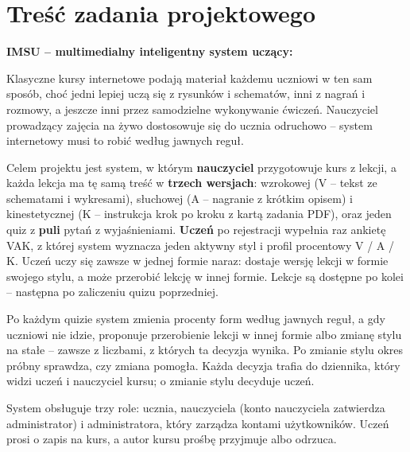 \section{Treść zadania projektowego}

\textbf{IMSU -- multimedialny inteligentny system uczący:}

Klasyczne kursy internetowe podają materiał każdemu uczniowi w ten sam sposób, choć jedni lepiej uczą się z rysunków i schematów, inni z nagrań i rozmowy, a jeszcze inni przez samodzielne wykonywanie ćwiczeń. Nauczyciel prowadzący zajęcia na żywo dostosowuje się do ucznia odruchowo -- system internetowy musi to robić według jawnych reguł.

Celem projektu jest system, w którym \textbf{nauczyciel} przygotowuje kurs z lekcji, a każda lekcja ma tę samą treść w \textbf{trzech wersjach}: wzrokowej (V -- tekst ze schematami i wykresami), słuchowej (A -- nagranie z krótkim opisem) i kinestetycznej (K -- instrukcja krok po kroku z kartą zadania PDF), oraz jeden quiz z \textbf{puli} pytań z wyjaśnieniami. \textbf{Uczeń} po rejestracji wypełnia raz ankietę VAK, z której system wyznacza jeden aktywny styl i profil procentowy V / A / K. Uczeń uczy się zawsze w jednej formie naraz: dostaje wersję lekcji w formie swojego stylu, a może przerobić lekcję w innej formie. Lekcje są dostępne po kolei -- następna po zaliczeniu quizu poprzedniej.

Po każdym quizie system zmienia procenty form według jawnych reguł, a gdy uczniowi nie idzie, proponuje przerobienie lekcji w innej formie albo zmianę stylu na stałe -- zawsze z liczbami, z których ta decyzja wynika. Po zmianie stylu okres próbny sprawdza, czy zmiana pomogła. Każda decyzja trafia do dziennika, który widzi uczeń i nauczyciel kursu; o zmianie stylu decyduje uczeń.

System obsługuje trzy role: ucznia, nauczyciela (konto nauczyciela zatwierdza administrator) i administratora, który zarządza kontami użytkowników. Uczeń prosi o zapis na kurs, a autor kursu prośbę przyjmuje albo odrzuca.
